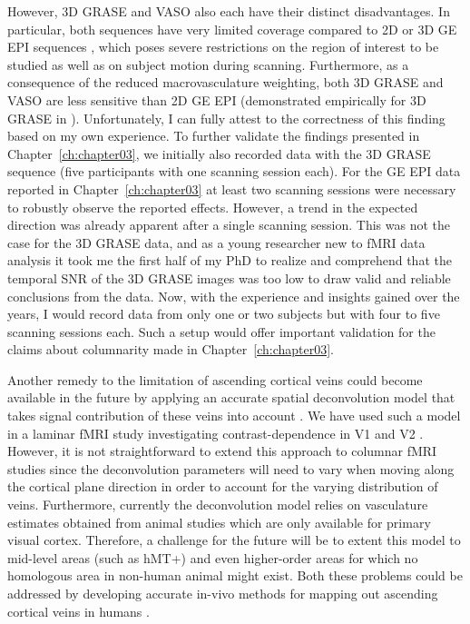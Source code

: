 However, 3D GRASE and VASO also each have their distinct disadvantages. In particular, both sequences have very limited coverage compared to 2D or 3D GE EPI sequences \parencite{Zimmermann2011, Huber2015, Huber2017}, which poses severe restrictions on the region of interest to be studied as well as on subject motion during scanning. Furthermore, as a consequence of the reduced macrovasculature weighting, both 3D GRASE and VASO are less sensitive than 2D GE EPI (demonstrated empirically for 3D GRASE in \cite{DeMartino2013}). Unfortunately, I can fully attest to the correctness of this finding based on my own experience. To further validate the findings presented in Chapter~\ref{ch:chapter03}, we initially also recorded data with the 3D GRASE sequence (five participants with one scanning session each). For the GE EPI data reported in Chapter~\ref{ch:chapter03} at least two scanning sessions were necessary to robustly observe the reported effects. However, a trend in the expected direction was already apparent after a single scanning session. This was not the case for the 3D GRASE data, and as a young researcher new to fMRI data analysis it took me the first half of my PhD to realize and comprehend that the temporal SNR of the 3D GRASE images was too low to draw valid and reliable conclusions from the data. Now, with the experience and insights gained over the years, I would record data from only one or two subjects but with four to five scanning sessions each. Such a setup would offer important validation for the claims about columnarity made in Chapter~\ref{ch:chapter03}.

Another remedy to the limitation of ascending cortical veins could become available in the future by applying an accurate spatial deconvolution model that takes signal contribution of these veins into account \parencite{Markuerkiaga2016}. We have used such a model in a laminar fMRI study investigating contrast-dependence in V1 and V2 \parencite{Marquardt2018}. However, it is not straightforward to extend this approach to columnar fMRI studies since the deconvolution parameters will need to vary when moving along the cortical plane direction in order to account for the varying distribution of veins. Furthermore, currently the deconvolution model relies on vasculature estimates obtained from animal studies which are only available for primary visual cortex. Therefore, a challenge for the future will be to extent this model to mid-level areas (such as hMT+) and even higher-order areas for which no homologous area in non-human animal might exist. Both these problems could be addressed by developing accurate in-vivo methods for mapping out ascending cortical veins in humans \parencite{DeMartino2016}.

